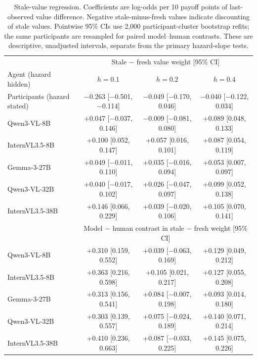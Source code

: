 \documentclass[letterpaper]{article} %
\begin{document}
\begin{table}[!t]\centering\small
  \setlength{\tabcolsep}{5pt}
  \begin{tabular}{l ccc}
    \toprule
    & \multicolumn{3}{c}{Stale $-$ fresh value weight [95\% CI]} \\
    Agent (hazard hidden) & $h=0.1$ & $h=0.2$ & $h=0.4$ \\
    \midrule
    Participants (hazard stated) & $-$0.263 [$-$0.501, $-$0.114] & $-$0.049 [$-$0.170, 0.046] & $-$0.040 [$-$0.122, 0.034] \\
    Qwen3-VL-8B & +0.047 [$-$0.037, 0.146] & $-$0.009 [$-$0.081, 0.080] & +0.089 [0.048, 0.133] \\
    InternVL3.5-8B & +0.100 [0.052, 0.147] & +0.057 [0.016, 0.101] & +0.087 [0.054, 0.119] \\
    Gemma-3-27B & +0.049 [$-$0.011, 0.110] & +0.035 [$-$0.016, 0.094] & +0.053 [0.007, 0.097] \\
    Qwen3-VL-32B & +0.040 [$-$0.017, 0.102] & +0.026 [$-$0.047, 0.097] & +0.099 [0.052, 0.138] \\
    InternVL3.5-38B & +0.146 [0.066, 0.229] & +0.039 [$-$0.020, 0.106] & +0.105 [0.070, 0.141] \\
    \midrule
    & \multicolumn{3}{c}{Model $-$ human contrast in stale $-$ fresh weight [95\% CI]} \\
    \midrule
    Qwen3-VL-8B & +0.310 [0.159, 0.552] & +0.039 [$-$0.063, 0.169] & +0.129 [0.049, 0.212] \\
    InternVL3.5-8B & +0.363 [0.216, 0.598] & +0.105 [0.021, 0.217] & +0.127 [0.055, 0.208] \\
    Gemma-3-27B & +0.313 [0.156, 0.541] & +0.084 [$-$0.007, 0.198] & +0.093 [0.014, 0.180] \\
    Qwen3-VL-32B & +0.303 [0.139, 0.557] & +0.075 [$-$0.024, 0.189] & +0.140 [0.071, 0.214] \\
    InternVL3.5-38B & +0.410 [0.236, 0.663] & +0.087 [$-$0.033, 0.225] & +0.145 [0.075, 0.226] \\
    \bottomrule
  \end{tabular}
  \caption{Stale-value regression. Coefficients are log-odds per 10 payoff points of last-observed value difference. Negative stale-minus-fresh values indicate discounting of stale values. Pointwise 95\% CIs use 2{,}000 participant-cluster bootstrap refits; the same participants are resampled for paired model--human contrasts. These are descriptive, unadjusted intervals, separate from the primary hazard-slope tests.}
  \label{tab:stale}
\end{table}
\end{document}
